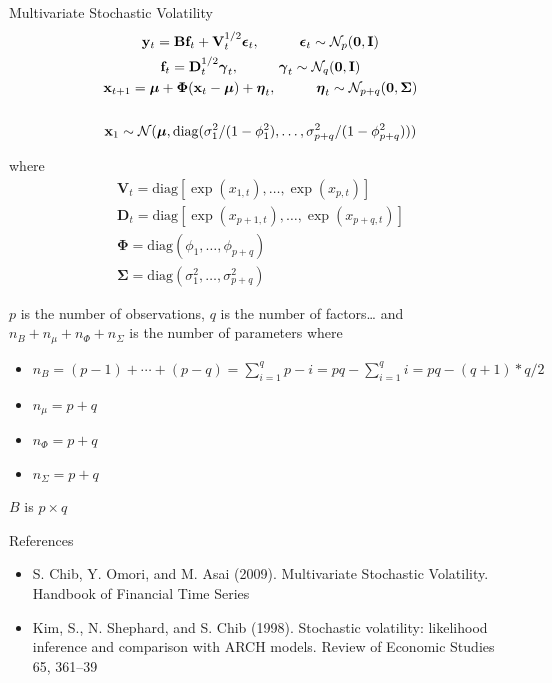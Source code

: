 \documentclass[
  ignorenonframetext,
]{beamer}
\providecommand{\tightlist}{%
  \setlength{\itemsep}{0pt}\setlength{\parskip}{0pt}}
\begin{document}
\begin{frame}{Multivariate Stochastic Volatility}
\protect\hypertarget{multivariate-stochastic-volatility}{}
\[
\begin{gather*}
\mathbf{y}_t = \mathbf{B} \mathbf{f}_t + \mathbf{V}_t^{1/2} \boldsymbol{\epsilon}_t, \hspace{10mm} \boldsymbol{\epsilon}_t \sim \mathcal{N}_p(\boldsymbol{0}, \mathbf{I}) \\
\mathbf{f}_t =  \mathbf{D}_t^{1/2} \boldsymbol{\gamma}_t, \hspace{10mm} \boldsymbol{\gamma}_t \sim \mathcal{N}_q(\boldsymbol{0}, \mathbf{I}) \\
\mathbf{x}_{t+1} = \boldsymbol{\mu} + \boldsymbol{\Phi} (\mathbf{x}_{t} - \boldsymbol{\mu}) + \boldsymbol{\eta}_t,  \hspace{10mm} \boldsymbol{\eta}_t \sim \mathcal{N}_{p+q}(\boldsymbol{0}, \boldsymbol{\Sigma} ) \\\\
\mathbf{x}_1 \sim \mathcal{N}(\boldsymbol{\mu},  \text{diag}(\sigma^2_1/(1-\phi_1^2), \ldots, \sigma^2_{p+q}/(1-\phi_{p+q}^2)  ) ) \\
\end{gather*}
\]

where \[
\begin{gather*}
\mathbf{V}_t = \text{diag}[\exp(x_{1,t}), \ldots, \exp(x_{p,t}) ] \\
\mathbf{D}_t = \text{diag}[\exp(x_{p+1,t}), \ldots, \exp(x_{p+q,t}) ] \\
\boldsymbol{\Phi} = \text{diag}(\phi_1, \ldots, \phi_{p+q}) \\
\boldsymbol{\Sigma} = \text{diag}(\sigma^2_1, \ldots, \sigma^2_{p+q}) 
\end{gather*}
\]

\(p\) is the number of observations, \(q\) is the number of
factors\ldots{} and \(n_B + n_\mu + n_\Phi + n_\Sigma\) is the number of
parameters where

\begin{itemize}
\tightlist
\item
  \(n_B = (p-1) + \cdots + (p - q ) = \sum_{i=1}^q p - i = pq - \sum_{i=1}^qi = pq - (q+1)*q/2\)
\item
  \(n_\mu = p+q\)
\item
  \(n_\Phi = p+q\)
\item
  \(n_\Sigma = p+q\)
\end{itemize}

\(B\) is \(p \times q\)
\end{frame}

\begin{frame}{References}
\protect\hypertarget{references}{}
\begin{itemize}
\item
  S. Chib, Y. Omori, and M. Asai (2009). Multivariate Stochastic
  Volatility. Handbook of Financial Time Series
\item
  Kim, S., N. Shephard, and S. Chib (1998). Stochastic volatility:
  likelihood inference and comparison with ARCH models. Review of
  Economic Studies 65, 361--39
\end{itemize}
\end{frame}
\end{document}
